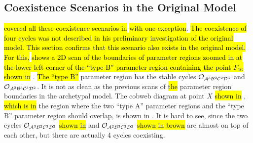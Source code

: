 \subsection{Coexistence Scenarios in the Original Model}

 \hl{covered all these coexistence scenarios in} \cite{akyuz2022} \hl{with one exception}.
\hl{
	The coexistence of four cycles was not described in his preliminary investigation of the original model.
	This section confirms that this scenario also exists in the original model.
}
\hl{For this,}  \hl{shows a 2D scan of the boundaries of parameter regions zoomed in at the lower left corner of the ``type B'' parameter region containing the point $F_{16}$ shown in} .
\hl{The ``type B''} parameter region has the stable cycles $\mathcal{O}_{\mathcal{A}^3\mathcal{B}^2\mathcal{C}^2\mathcal{D}^3}$ and $\mathcal{O}_{\mathcal{A}^2\mathcal{B}^3\mathcal{C}^3\mathcal{D}^2}$.
It is not as clean as the previous scans of \hl{the} parameter region boundaries in the archetypal model.
The cobweb diagram at point $X$ \hl{shown in} , \hl{which is in} the region where the two ``type A'' parameter regions and the ``type B'' parameter region should overlap, is shown in .
It is hard to see, since the two cycles $\mathcal{O}_{\mathcal{A}^3\mathcal{B}^2\mathcal{C}^3\mathcal{D}^2}$ \hl{shown in} and $\mathcal{O}_{\mathcal{A}^2\mathcal{B}^3\mathcal{C}^3\mathcal{D}^2}$ \hl{shown in brown} are almost on top of each other, but there are actually 4 cycles coexisting.

